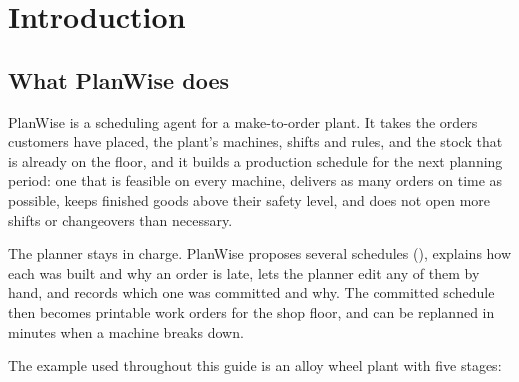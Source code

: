 \chapter{Introduction}\label{ch:intro}

\section{What PlanWise does}

PlanWise is a scheduling agent for a make-to-order plant. It takes the orders customers have placed, the
plant's machines, shifts and rules, and the stock that is already on the floor, and it builds a
 production schedule for the next planning period: one that is feasible on every machine,
delivers as many orders on time as possible, keeps finished goods above their safety level, and does not open
more shifts or changeovers than necessary.

The planner stays in charge. PlanWise proposes several schedules (), explains how each was
built and why an order is late, lets the planner edit any of them by hand, and records which one was
committed and why. The committed schedule then becomes printable work orders for the shop floor, and can be
replanned in minutes when a machine breaks down.

The example used throughout this guide is an alloy wheel plant with five stages:

\begin{center}
\end{center}

